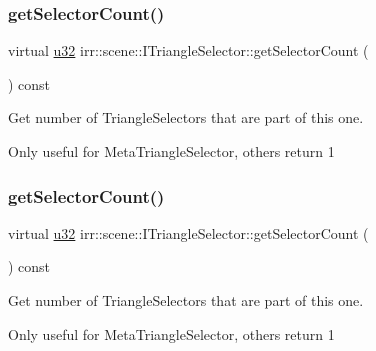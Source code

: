\subsubsection{\texorpdfstring{get\+Selector\+Count()}{getSelectorCount()}\hspace{0.1cm}{\footnotesize\ttfamily [1/2]}}
{\footnotesize\ttfamily virtual \hyperlink{namespaceirr_a0416a53257075833e7002efd0a18e804}{u32} irr\+::scene\+::\+I\+Triangle\+Selector\+::get\+Selector\+Count (\begin{DoxyParamCaption}{ }\end{DoxyParamCaption}) const\hspace{0.3cm}{\ttfamily [pure virtual]}}



Get number of Triangle\+Selectors that are part of this one. 

Only useful for Meta\+Triangle\+Selector, others return 1 \mbox{\label{classirr_1_1scene_1_1ITriangleSelector_ae0d51279cab70e31a6aa2646e3b05df4}} 
\subsubsection{\texorpdfstring{get\+Selector\+Count()}{getSelectorCount()}\hspace{0.1cm}{\footnotesize\ttfamily [2/2]}}
{\footnotesize\ttfamily virtual \hyperlink{namespaceirr_a0416a53257075833e7002efd0a18e804}{u32} irr\+::scene\+::\+I\+Triangle\+Selector\+::get\+Selector\+Count (\begin{DoxyParamCaption}{ }\end{DoxyParamCaption}) const\hspace{0.3cm}{\ttfamily [pure virtual]}}



Get number of Triangle\+Selectors that are part of this one. 

Only useful for Meta\+Triangle\+Selector, others return 1 \mbox{\label{classirr_1_1scene_1_1ITriangleSelector_a63b547218902d57a44357d3a246e5070}} 
